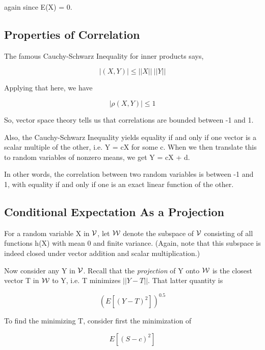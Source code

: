 again since E(X) = 0.

\subsection{Properties of Correlation}
\label{propcorr}

The famous Cauchy-Schwarz Inequality for inner products says,

\begin{equation}
|(X,Y)| \leq ||X|| ~ ||Y||
\end{equation}

Applying that here, we have

\begin{equation}
|\rho(X,Y)| \leq 1
\end{equation}

So, vector space theory tells us that correlations are bounded between
-1 and 1.

Also, the Cauchy-Schwarz Inequality yields equality if and only if one
vector is a scalar multiple of the other, i.e. Y = cX for some c.
When we then translate this to random variables of nonzero means,
we get Y = cX + d.  

In other words, the correlation between two random variables is between
-1 and 1, with equality if and only if one is an exact linear function
of the other.

\subsection{Conditional Expectation As a Projection}
\label{elegant} 

For a random variable X in $\cal V$, let $\cal W$ denote the subspace of
$\cal V$ consisting of all functions h(X) with mean 0 and finite
variance.  (Again, note that this subspace is indeed closed under vector
addition and scalar multiplication.) 

Now consider any Y in $\cal V$.  Recall that the {\it projection} of Y
onto $\cal W$ is the closest vector T in $\cal W$ to Y, i.e. T minimizes
$||Y-T||$.  That latter quantity is 

\begin{equation}
\label{l2}
{\left ( E[{(Y-T)}^2] \right )}^{0.5}
\end{equation}

To find the minimizing T, consider first the minimization of

\begin{equation}
\label{minsc}
E[{(S-c)}^2]
\end{equation}

